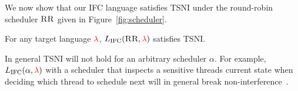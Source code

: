 \documentclass{sigplanconf}
\newcommand{\Red}[1]{{\color{red} #1}}
\newcommand{\toref}[1]{\Red{\ref{#1}}}
\begin{document}
We now show that our IFC language satisfies TSNI %
%
under the round-robin scheduler
\ensuremath{\textsc{RR}} given in Figure~\ref{fig:scheduler}.

\begin{theorem}
  \label{thm:rr-tsni}
For any target language \ensuremath{\Red{\lambda}}, \ensuremath{L_\text{IFC}(\textsc{RR},\Red{\lambda})} satisfies TSNI.
\end{theorem}

In general TSNI will not hold for an arbitrary scheduler \ensuremath{\alpha}.
%
For example, \ensuremath{L_\text{IFC}(\alpha,\Red{\lambda})} with a scheduler that inspects a
sensitive threads current state when deciding which thread to schedule next
will in general break non-interference~\cite{Russo:Sabelfeld:CSFW06,BartheRRS07}.
%
%
\end{document}
